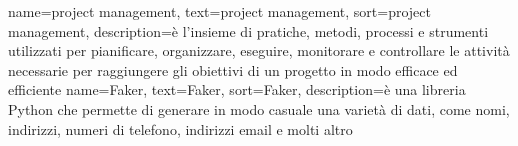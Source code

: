 {
    name={project management},
    text=project management,
    sort=project management,
    description={è l'insieme di pratiche, metodi, processi e strumenti utilizzati per pianificare, organizzare, eseguire, monitorare e controllare le attività necessarie per raggiungere gli obiettivi di un progetto in modo efficace ed efficiente}
}
{
    name={Faker},
    text=Faker,
    sort=Faker,
    description={è una libreria Python che permette di generare in modo casuale una varietà di dati, come nomi, indirizzi, numeri di telefono, indirizzi email e molti altro}
}